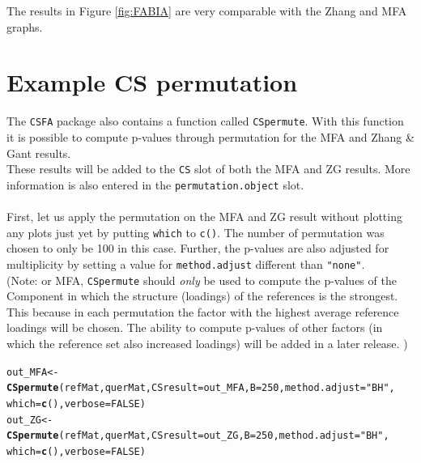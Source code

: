 \documentclass[a4paper]{article}\usepackage[]{graphicx}\usepackage[]{color}
\makeatletter
\newcommand{\hlnum}[1]{\textcolor[rgb]{0.686,0.059,0.569}{#1}}%
\newcommand{\hlstr}[1]{\textcolor[rgb]{0.192,0.494,0.8}{#1}}%
\newcommand{\hlstd}[1]{\textcolor[rgb]{0.345,0.345,0.345}{#1}}%
\newcommand{\hlkwb}[1]{\textcolor[rgb]{0.69,0.353,0.396}{#1}}%
\newcommand{\hlkwc}[1]{\textcolor[rgb]{0.333,0.667,0.333}{#1}}%
\newcommand{\hlkwd}[1]{\textcolor[rgb]{0.737,0.353,0.396}{\textbf{#1}}}%
\newenvironment{kframe}{%
 \def\at@end@of@kframe{}%
 \ifinner\ifhmode%
  \def\at@end@of@kframe{\end{minipage}}%
  \begin{minipage}{\columnwidth}%
 \fi\fi%
 \def\FrameCommand##1{\hskip\@totalleftmargin \hskip-\fboxsep
 \colorbox{shadecolor}{##1}\hskip-\fboxsep
     \hskip-\linewidth \hskip-\@totalleftmargin \hskip\columnwidth}%
 \MakeFramed {\advance\hsize-\width
   \@totalleftmargin\z@ \linewidth\hsize
   \@setminipage}}%
 {\par\unskip\endMakeFramed%
 \at@end@of@kframe}
\newenvironment{knitrout}{}{} %
\makeatother
\begin{document}
\noindent The results in Figure \ref{fig:FABIA} are very comparable with the
Zhang and MFA graphs.

\section{Example CS permutation}
The \texttt{CSFA} package also contains a function called \texttt{CSpermute}.
With this function it is possible to compute p-values through permutation for
the MFA and Zhang \& Gant results. \\
These results will be added to the \verb|CS| slot of both the MFA and ZG
results. More information is also entered in the \verb|permutation.object| slot. 
\\ \\
First, let us apply the permutation on the MFA and ZG result without plotting
any plots just yet by putting \texttt{which} to \texttt{c()}. The number of
permutation was chosen to only be 100 in this case. Further, the p-values are
also adjusted for multiplicity by setting a value for \texttt{method.adjust}
different than \texttt{"none"}.\\
(Note: or MFA, \texttt{CSpermute} should {\it only} be used to compute the
p-values of the Component in which the structure (loadings) of the references is the strongest.
This because in each permutation the factor with the highest average reference loadings will be chosen. 
The ability to compute p-values of other factors (in which the reference set also increased loadings) will be added in a later release. 
)


\begin{knitrout}
\color{fgcolor}\begin{kframe}
\begin{alltt}
        \hlstd{out_MFA} \hlkwb{<-} \hlkwd{CSpermute}\hlstd{(refMat,querMat,}\hlkwc{CSresult}\hlstd{=out_MFA,}\hlkwc{B}\hlstd{=}\hlnum{250}\hlstd{,}\hlkwc{method.adjust}\hlstd{=}\hlstr{"BH"}\hlstd{,}
                        \hlkwc{which}\hlstd{=}\hlkwd{c}\hlstd{(),}\hlkwc{verbose}\hlstd{=}\hlnum{FALSE}\hlstd{)}
        \hlstd{out_ZG} \hlkwb{<-} \hlkwd{CSpermute}\hlstd{(refMat,querMat,}\hlkwc{CSresult}\hlstd{=out_ZG,}\hlkwc{B}\hlstd{=}\hlnum{250}\hlstd{,}\hlkwc{method.adjust}\hlstd{=}\hlstr{"BH"}\hlstd{,}
                        \hlkwc{which}\hlstd{=}\hlkwd{c}\hlstd{(),}\hlkwc{verbose}\hlstd{=}\hlnum{FALSE}\hlstd{)}
\end{alltt}
\end{kframe}
\end{knitrout}
\end{document}
